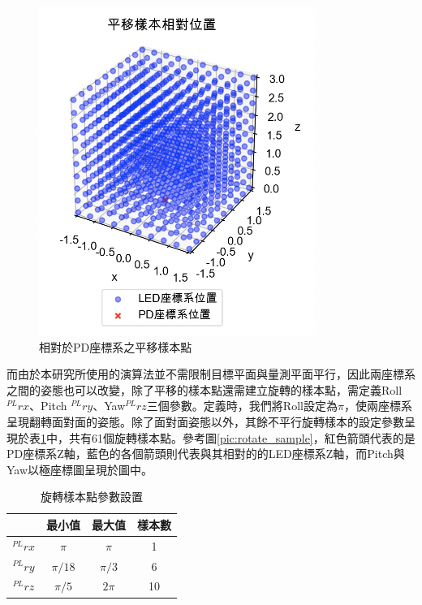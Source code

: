 \begin{figure}[htpb]
    \centering
    \includegraphics[width=9cm]{ch4pic/translate_sample.png}
    \caption{相對於PD座標系之平移樣本點}
    \label{pic:translate_sample}
\end{figure}

而由於本研究所使用的演算法並不需限制目標平面與量測平面平行，因此兩座標系之間的姿態也可以改變，除了平移的樣本點還需建立旋轉的樣本點，需定義Roll $^{PL}rx$、Pitch $^{PL}ry$、Yaw$^{PL}rz$三個參數。定義時，我們將Roll設定為$\pi$，使兩座標系呈現翻轉面對面的姿態。除了面對面姿態以外，其餘不平行旋轉樣本的設定參數呈現於表\ref{tab:rotate}中，共有61個旋轉樣本點。參考圖\ref{pic:rotate_sample}，紅色箭頭代表的是PD座標系Z軸，藍色的各個箭頭則代表與其相對的的LED座標系Z軸，而Pitch與Yaw以極座標圖呈現於圖中。



\begin{table}[htpb]
    \begin{center}
      \caption{旋轉樣本點參數設置}
      \label{tab:rotate}
      \begin{tabular}{c|c|c|c} %
        & \textbf{最小值} & \textbf{最大值}&\textbf{樣本數}\\
       \hline
       $^{PL}rx$ & $\pi$ & $\pi$&1\\
       $^{PL}ry$ & $\pi/18$ &$\pi/3$&6\\
       $^{PL}rz$ & $\pi/5$ & $2\pi$&10\\
     \end{tabular}
   \end{center}
 \end{table}

